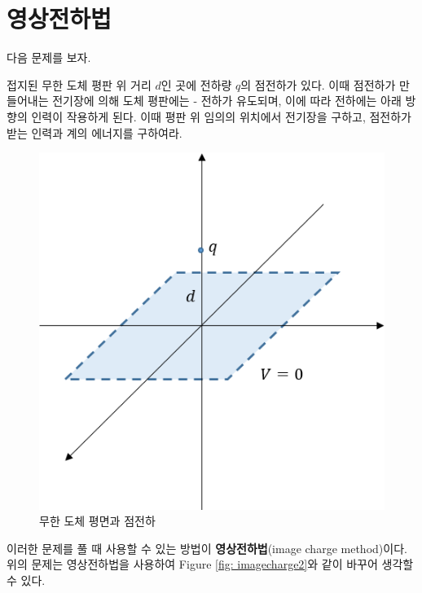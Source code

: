 \section{영상전하법}
다음 문제를 보자.
\begin{example}
접지된 무한 도체 평판 위 거리 $d$인 곳에 전하량 $q$의 점전하가 있다. 이때 점전하가 만들어내는 전기장에 의해 도체 평판에는 - 전하가 유도되며, 이에 따라 전하에는 아래 방향의 인력이 작용하게 된다. 이때 평판 위 임의의 위치에서 전기장을 구하고, 점전하가 받는 인력과 계의 에너지를 구하여라.\label{imagecharge}
\begin{figure}[h]
\centering\includegraphics[scale=0.5]{Pictures/image_charge-1.PNG}
\caption{무한 도체 평면과 점전하}
\end{figure}

\end{example}
이러한 문제를 풀 때 사용할 수 있는 방법이 \textbf{영상전하법}(image charge method)이다. 위의 문제는 영상전하법을 사용하여 Figure \ref{fig: imagecharge2}와 같이 바꾸어 생각할 수 있다.
